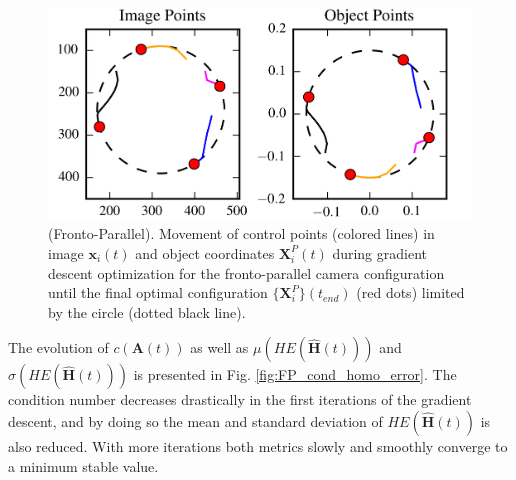 \documentclass[letterpaper, 10 pt, conference]{ieeeconf}  %
\begin{document}
	\begin{figure}[t]
		\begin{center}
			\includegraphics[width=\columnwidth]{img/image_control_points.png}
			\caption{\label{fig:FP_points}\small (Fronto-Parallel). Movement of control points (colored lines) in image $\mathbf{x}_i(t)$ and object coordinates $\mathbf{X}^P_i(t)$ during gradient descent optimization for the fronto-parallel camera configuration until the final optimal configuration $\{\mathbf{X}^P_{i}\}(t_{end})$ (red dots) limited by the circle (dotted black line). }
		\end{center}
		\vspace{-0.5cm}
	\end{figure}
	
	
	The evolution of $c(\mathbf{A}(t))$ as well as $\mu\left(HE\left(\hat{\mathbf{H}}(t)\right)\right)$ and $\sigma\left(HE\left(\hat{\mathbf{H}}(t)\right)\right)$
	is presented in Fig. \ref{fig:FP_cond_homo_error}. The condition number decreases drastically in the first iterations of the gradient descent,  and by doing so the mean and standard deviation of $HE\left(\hat{\mathbf{H}}(t)\right)$ is also reduced. With more iterations both metrics slowly and smoothly converge to a minimum stable value. 
	
\end{document}
